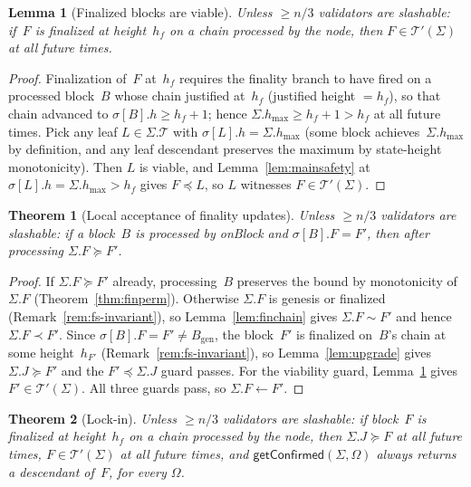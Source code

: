 \ifx\litemode\undefined\documentclass{article}\fi
\newcommand{\genesis}{\ensuremath{B_{\mathrm{gen}}}}
\newcommand{\T}[0]{\ensuremath{\mathcal{T}}}
\newcommand{\hmax}{\ensuremath{h_{\max}}\xspace}
\newcommand{\viableTree}{\ensuremath{\mathcal{T}'}}
\newcommand{\onBlock}{\textsf{onBlock}\xspace}
\newcommand{\getConfirmed}{\textsf{getConfirmed}\xspace}
\theoremstyle{plain}
\newtheorem{theorem}{Theorem}
\newtheorem{lemma}{Lemma}
\theoremstyle{definition}
\theoremstyle{remark}
\begin{document}
\begin{lemma}[Finalized blocks are viable]\label{lem:viable-finalized}
Unless $\geq n/3$ validators are slashable: if~$F$ is finalized at height~$h_f$ on a chain processed by the node, then $F \in \viableTree(\Sigma)$ at all future times.
\end{lemma}

\begin{proof}
Finalization of~$F$ at~$h_f$ requires the finality branch to have fired on a processed block~$B$ whose chain justified at~$h_f$ (justified height $= h_f$), so that chain advanced to $\sigma[B].h \geq h_f + 1$; hence $\Sigma.\hmax \geq h_f + 1 > h_f$ at all future times.
Pick any leaf $L \in \Sigma.\T$ with $\sigma[L].h = \Sigma.\hmax$ (some block achieves~$\Sigma.\hmax$ by definition, and any leaf descendant preserves the maximum by state-height monotonicity).
Then $L$ is viable, and Lemma~\ref{lem:mainsafety} at $\sigma[L].h = \Sigma.\hmax > h_f$ gives $F \preceq L$, so $L$ witnesses $F \in \viableTree(\Sigma)$.
\end{proof}

\begin{theorem}[Local acceptance of finality updates]\label{thm:finlive}
Unless $\geq n/3$ validators are slashable: if a block~$B$ is processed by \onBlock and $\sigma[B].F = F'$, then after processing $\Sigma.F \succeq F'$.
\end{theorem}

\begin{proof}
If $\Sigma.F \succeq F'$ already, processing~$B$ preserves the bound by monotonicity of~$\Sigma.F$ (Theorem~\ref{thm:finperm}).
Otherwise $\Sigma.F$ is genesis or finalized (Remark~\ref{rem:fs-invariant}), so Lemma~\ref{lem:finchain} gives $\Sigma.F \sim F'$ and hence $\Sigma.F \prec F'$.
Since $\sigma[B].F = F' \neq \genesis$, the block~$F'$ is finalized on~$B$'s chain at some height~$h_{F'}$ (Remark~\ref{rem:fs-invariant}), so Lemma~\ref{lem:upgrade} gives $\Sigma.J \succeq F'$ and the $F' \preceq \Sigma.J$ guard passes.
For the viability guard, Lemma~\ref{lem:viable-finalized} gives $F' \in \viableTree(\Sigma)$.
All three guards pass, so $\Sigma.F \gets F'$.
\end{proof}

\begin{theorem}[Lock-in]\label{thm:lockin}
Unless $\geq n/3$ validators are slashable: if block~$F$ is finalized at height~$h_f$ on a chain processed by the node, then $\Sigma.J \succeq F$ at all future times, $F \in \viableTree(\Sigma)$ at all future times, and $\getConfirmed(\Sigma, \Omega)$ always returns a descendant of~$F$, for every $\Omega$.
\end{theorem}
\end{document}

